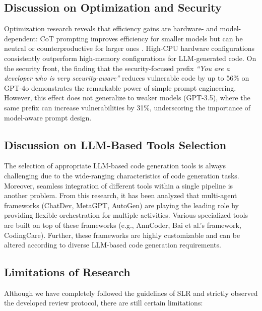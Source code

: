 \documentclass[11pt,a4paper]{article}
\begin{document}
\subsection{Discussion on Optimization and Security}

Optimization research reveals that efficiency gains are hardware- and model-dependent: CoT prompting improves efficiency for smaller models but can be neutral or counterproductive for larger ones \cite{jonnala2025}. High-CPU hardware configurations consistently outperform high-memory configurations for LLM-generated code. On the security front, the finding that the security-focused prefix \textit{``You are a developer who is very security-aware''} reduces vulnerable code by up to 56\% on GPT-4o \cite{bruni2025} demonstrates the remarkable power of simple prompt engineering. However, this effect does not generalize to weaker models (GPT-3.5), where the same prefix can increase vulnerabilities by 31\%, underscoring the importance of model-aware prompt design.

\subsection{Discussion on LLM-Based Tools Selection}

The selection of appropriate LLM-based code generation tools is always challenging due to the wide-ranging characteristics of code generation tasks. Moreover, seamless integration of different tools within a single pipeline is another problem. From this research, it has been analyzed that multi-agent frameworks (ChatDev, MetaGPT, AutoGen) are playing the leading role by providing flexible orchestration for multiple activities. Various specialized tools are built on top of these frameworks (e.g., AnnCoder, Bai et al.'s framework, CodingCare). Further, these frameworks are highly customizable and can be altered according to diverse LLM-based code generation requirements.

\subsection{Limitations of Research}

Although we have completely followed the guidelines of SLR and strictly observed the developed review protocol, there are still certain limitations:
\end{document}

